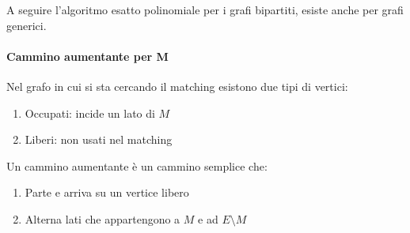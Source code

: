 A seguire l'algoritmo esatto polinomiale per i grafi bipartiti, esiste anche 
per grafi generici.

\paragraph{Cammino aumentante per M}
Nel grafo in cui si sta cercando il matching esistono due tipi di vertici:
\begin{enumerate}
    \item Occupati: incide un lato di $M$
    \item Liberi: non usati nel matching
\end{enumerate}
Un cammino aumentante è un cammino semplice che:
\begin{enumerate}
    \item Parte e arriva su un vertice libero
    \item Alterna lati che appartengono a $M$ e ad $E\setminus M$
\end{enumerate}

